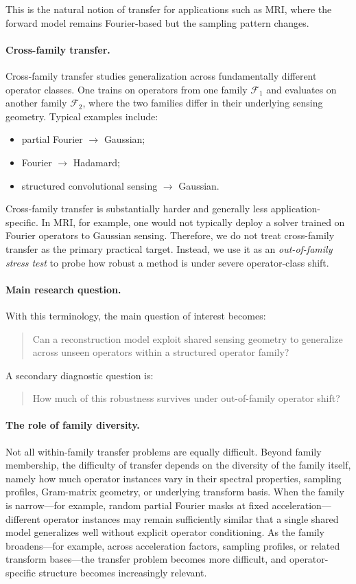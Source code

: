 \documentclass[11pt]{article}
\begin{document}
This is the natural notion of transfer for applications such as MRI, where the forward model remains Fourier-based but the sampling pattern changes.

\paragraph{Cross-family transfer.}
Cross-family transfer studies generalization across fundamentally different operator classes. One trains on operators from one family \(\mathcal{F}_1\) and evaluates on another family \(\mathcal{F}_2\), where the two families differ in their underlying sensing geometry. Typical examples include:
\begin{itemize}
    \item partial Fourier \(\rightarrow\) Gaussian;
    \item Fourier \(\rightarrow\) Hadamard;
    \item structured convolutional sensing \(\rightarrow\) Gaussian.
\end{itemize}

Cross-family transfer is substantially harder and generally less application-specific. In MRI, for example, one would not typically deploy a solver trained on Fourier operators to Gaussian sensing. Therefore, we do not treat cross-family transfer as the primary practical target. Instead, we use it as an \emph{out-of-family stress test} to probe how robust a method is under severe operator-class shift.

\paragraph{Main research question.}
With this terminology, the main question of interest becomes:
\begin{quote}
Can a reconstruction model exploit shared sensing geometry to generalize across unseen operators within a structured operator family?
\end{quote}
A secondary diagnostic question is:
\begin{quote}
How much of this robustness survives under out-of-family operator shift?
\end{quote}

\paragraph{The role of family diversity.}
Not all within-family transfer problems are equally difficult. Beyond family membership, the difficulty of transfer depends on the diversity of the family itself, namely how much operator instances vary in their spectral properties, sampling profiles, Gram-matrix geometry, or underlying transform basis. When the family is narrow---for example, random partial Fourier masks at fixed acceleration---different operator instances may remain sufficiently similar that a single shared model generalizes well without explicit operator conditioning. As the family broadens---for example, across acceleration factors, sampling profiles, or related transform bases---the transfer problem becomes more difficult, and operator-specific structure becomes increasingly relevant.
\end{document}
